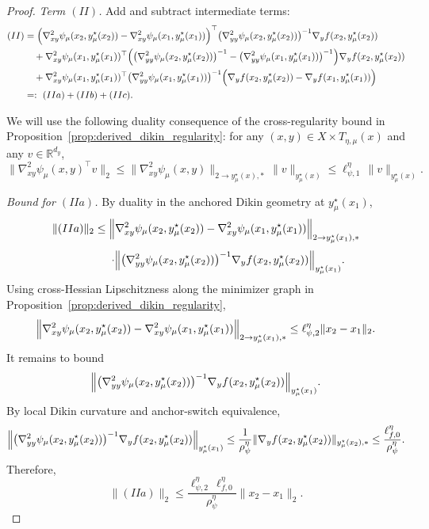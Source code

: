 \documentclass{article}
\begin{document}
\begin{proof}
\smallskip
\noindent\emph{Term \((II)\).}
Add and subtract intermediate terms:
\begin{align*}
(II)
&=
\Bigl(
\nabla^2_{xy}\psi_\mu(x_2,y_\mu^\star(x_2))
-
\nabla^2_{xy}\psi_\mu(x_1,y_\mu^\star(x_1))
\Bigr)^\top
\bigl(\nabla^2_{yy}\psi_\mu(x_2,y_\mu^\star(x_2))\bigr)^{-1}
\nabla_y f(x_2,y_\mu^\star(x_2))
\\
&\quad
+
\nabla^2_{xy}\psi_\mu(x_1,y_\mu^\star(x_1))^\top
\Bigl(
\bigl(\nabla^2_{yy}\psi_\mu(x_2,y_\mu^\star(x_2))\bigr)^{-1}
-
\bigl(\nabla^2_{yy}\psi_\mu(x_1,y_\mu^\star(x_1))\bigr)^{-1}
\Bigr)
\nabla_y f(x_2,y_\mu^\star(x_2))
\\
&\quad
+
\nabla^2_{xy}\psi_\mu(x_1,y_\mu^\star(x_1))^\top
\bigl(\nabla^2_{yy}\psi_\mu(x_1,y_\mu^\star(x_1))\bigr)^{-1}
\Bigl(
\nabla_y f(x_2,y_\mu^\star(x_2))
-
\nabla_y f(x_1,y_\mu^\star(x_1))
\Bigr)
\\
&=:\ (IIa)+(IIb)+(IIc).
\end{align*}

We will use the following duality consequence of the cross-regularity bound in
Proposition~\ref{prop:derived_dikin_regularity}: for any
\((x,y)\in X\times T_{\eta,\mu}(x)\) and any \(v\in\mathbb R^{d_y}\),
\begin{equation}
\label{eq:local_smooth_cross_duality}
\|\nabla^2_{xy}\psi_\mu(x,y)^\top v\|_2
\le
\|\nabla^2_{xy}\psi_\mu(x,y)\|_{2\to y_\mu^\star(x),*}\,
\|v\|_{y_\mu^\star(x)}
\le
\ell_{\psi,1}^\eta\,\|v\|_{y_\mu^\star(x)}.
\end{equation}

\smallskip
\noindent\emph{Bound for \((IIa)\).}
By duality in the anchored Dikin geometry at \(y_\mu^\star(x_1)\),
\[
\|(IIa)\|_2
\le
\Bigl\|
\nabla^2_{xy}\psi_\mu(x_2,y_\mu^\star(x_2))
-
\nabla^2_{xy}\psi_\mu(x_1,y_\mu^\star(x_1))
\Bigr\|_{2\to y_\mu^\star(x_1),*}
\]
\[
\qquad\qquad\cdot
\Bigl\|
\bigl(\nabla^2_{yy}\psi_\mu(x_2,y_\mu^\star(x_2))\bigr)^{-1}
\nabla_y f(x_2,y_\mu^\star(x_2))
\Bigr\|_{y_\mu^\star(x_1)}.
\]
Using cross-Hessian Lipschitzness along the minimizer graph in
Proposition~\ref{prop:derived_dikin_regularity},
\[
\Bigl\|
\nabla^2_{xy}\psi_\mu(x_2,y_\mu^\star(x_2))
-
\nabla^2_{xy}\psi_\mu(x_1,y_\mu^\star(x_1))
\Bigr\|_{2\to y_\mu^\star(x_1),*}
\le
\ell_{\psi,2}^\eta\|x_2-x_1\|_2.
\]
It remains to bound
\[
\Bigl\|
\bigl(\nabla^2_{yy}\psi_\mu(x_2,y_\mu^\star(x_2))\bigr)^{-1}
\nabla_y f(x_2,y_\mu^\star(x_2))
\Bigr\|_{y_\mu^\star(x_1)}.
\]
By local Dikin curvature and anchor-switch equivalence,
\[
\Bigl\|
\bigl(\nabla^2_{yy}\psi_\mu(x_2,y_\mu^\star(x_2))\bigr)^{-1}
\nabla_y f(x_2,y_\mu^\star(x_2))
\Bigr\|_{y_\mu^\star(x_1)}
\le
\frac{1}{\rho_\psi^\eta}
\|\nabla_y f(x_2,y_\mu^\star(x_2))\|_{y_\mu^\star(x_2),*}
\le
\frac{\ell^\eta_{f,0}}{\rho_\psi^\eta}.
\]
Therefore,
\begin{equation}
\label{eq:local_smooth_IIa}
\|(IIa)\|_2
\le
\frac{\ell_{\psi,2}^\eta\,\ell_{f,0}^\eta}{\rho_\psi^\eta}
\|x_2-x_1\|_2.
\end{equation}


\end{proof}
\end{document}
